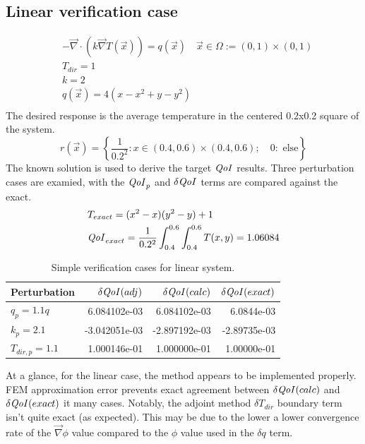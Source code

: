 \documentclass{article}
\newcommand{\vx}{\vec{x}}
\renewcommand{\div}{\vec{\nabla} \cdot}
\newcommand{\grad}{\vec{\nabla}}
\newcommand{\qoi}{{\it QoI}\xspace}
\newcommand{\Tdir}{T_{dir}}
\newcommand{\Tdirp}{T_{dir,p}}
\begin{document}
\subsection{Linear verification case}
\begin{equation}
\label{case0}
\begin{split}
& - \div ( k \grad T(\vx) ) = q(\vx) \quad \vx \in \Omega := (0,1) \times (0,1) \\
&\Tdir=1 \\
& k = 2 \\
& q(\vx) = 4 (x -x^2 + y - y^2) \\
\end{split}
\end{equation}
The desired response is the average temperature in the centered 0.2x0.2 square of the system.
\begin{equation}
r(\vx) = \left\lbrace \frac{1}{0.2^2}: x \in (0.4,0.6) \times (0.4,0.6); \quad 0: \text{ else} \right\rbrace
\end{equation}
The known solution is used to derive the target $\qoi$ results. Three perturbation cases are examied, with the $\qoi_p$ and $\delta \qoi$ terms are compared against the exact.
\begin{align}
& T_{exact}=(x^2-x)(y^2-y)+1\\
& \qoi_{exact} = \frac{1}{0.2^2} \int_{0.4}^{0.6} \int_{0.4}^{0.6} T(x,y) = 1.06084
\end{align}

\begin{table}[H]
\centering
  \begin{tabular}{| l | r | r | r |}
    \hline
    Perturbation  &  $\delta \qoi (adj)$ & $\delta \qoi (calc)$ & $\delta \qoi (exact)$ \\ \hline
     $q_p = 1.1 q $ &   6.084102e-03 & 6.084102e-03  & 6.0844e-03 \\ \hline
     $k_p = 2.1 $  &  -3.042051e-03 & -2.897192e-03 & -2.89735e-03 \\ \hline
     $\Tdirp=1.1$  &  1.000146e-01 & 1.000000e-01 & 1.00000e-01 \\ \hline
    \end{tabular}
  \caption{Simple verification cases for linear system.}
\end{table}

At a glance, for the linear case, the method appears to be implemented properly. FEM approximation error prevents exact agreement between $\delta \qoi (calc)$ and $\delta \qoi (exact)$ it many cases. Notably, the adjoint method $\delta \Tdir$ boundary term isn't quite exact (as expected). This may be due to the lower a lower convergence rate of the $\grad \phi$ value compared to the $\phi$ value used in the $\delta q$ term.
\end{document}

